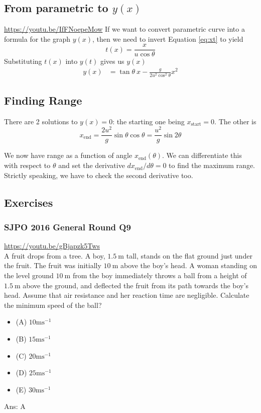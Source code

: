 \documentclass{article}
\begin{document}
\subsection{From parametric to $y(x)$}
\url{https://youtu.be/IfFNoepeMow}
If we want to convert parametric curve into a formula for the graph $y(x)$, then we need to invert Equation \ref{eq:xt} to yield $$t(x) = {\frac{x}{u \cos \theta}}$$
Substituting $t(x)$ into $y(t)$ gives us $y(x)$
\begin{align}
    y(x) &= \tan \theta\ x - \frac{g}{2u^2 \cos^2 \theta} x^2
\end{align}
\subsection{Finding Range}
There are 2 solutions to $y(x) = 0$: the starting one being $x_{\text{start}}=0$. The other is 
$$x_{\text{end}} = \frac{2u^2}{g} \sin \theta \cos \theta = \frac{u^2}{g} \sin 2\theta$$

We now have range as a function of angle $x_{\text{end}}(\theta)$. We can differentiate this with respect to $\theta$ and set the derivative $dx_{\text{end}}/d\theta = 0$ to find the maximum range. Strictly speaking, we have to check the second derivative too.
\subsection{Exercises}
\begin{samepage}
\subsubsection{SJPO 2016 General Round Q9}
\url{https://youtu.be/gBjapzk5Tws}\\[10pt]
A fruit drops from a tree. A boy, $1.5 \mathrm{~m}$ tall, stands on the flat ground just under the fruit. The fruit was initially $10 \mathrm{~m}$ above the boy's head. A woman standing on the level ground $10 \mathrm{~m}$ from the boy immediately throws a ball from a height of $1.5 \mathrm{~m}$ above the ground, and deflected the fruit from its path towards the boy's head. Assume that air resistance and her reaction time are negligible. Calculate the minimum speed of the ball?
\begin{itemize}
\item[](A) $10 \mathrm{ms}^{-1}$
\item[](B) $15 \mathrm{ms}^{-1}$
\item[](C) $20 \mathrm{ms}^{-1}$
\item[](D) $25 \mathrm{ms}^{-1}$
\item[](E) $30 \mathrm{ms}^{-1}$
\end{itemize}
Ans: \ifpaper A \fi \\[10pt]
\end{samepage}
\end{document}
